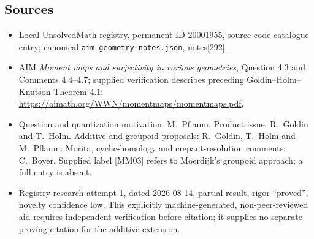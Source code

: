 \documentclass[11pt]{article}
\begin{document}
\subsection{Sources}
\begin{itemize}
\item Local UnsolvedMath registry, permanent ID 20001955, source code catalogue entry; canonical \texttt{aim-geometry-notes.json}, notes[292].
\item AIM \emph{Moment maps and surjectivity in various geometries}, Question 4.3 and Comments 4.4--4.7; supplied verification describes preceding Goldin--Holm--Knutson Theorem 4.1: \url{https://aimath.org/WWN/momentmaps/momentmaps.pdf}.
\item Question and quantization motivation: M.~Pflaum. Product issue: R.~Goldin and T.~Holm. Additive and groupoid proposals: R.~Goldin, T.~Holm and M.~Pflaum. Morita, cyclic-homology and crepant-resolution comments: C.~Boyer. Supplied label [MM03] refers to Moerdijk's groupoid approach; a full entry is absent.
\item Registry research attempt 1, dated 2026-08-14, partial result, rigor ``proved'', novelty confidence low. This explicitly machine-generated, non-peer-reviewed aid requires independent verification before citation; it supplies no separate proving citation for the additive extension.
\end{itemize}
\end{document}
